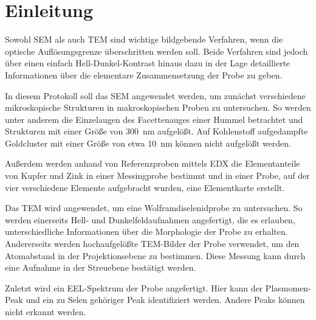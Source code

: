 \section{Einleitung}

	Sowohl SEM als auch TEM sind wichtige bildgebende Verfahren, wenn die optische Auflösungsgrenze überschritten werden soll.
	Beide Verfahren sind jedoch über einen einfach Hell-Dunkel-Kontrast hinaus dazu in der Lage detaillierte Informationen über die elementare Zusammensetzung der Probe zu geben.

	In diesem Protokoll soll das SEM angewendet werden, um zunächst verschiedene mikroskopische Strukturen in makroskopischen Proben zu untersuchen.
	So werden unter anderem die Einzelaugen des Facettenauges einer Hummel betrachtet und Strukturen mit einer Größe von \SI{300}{nm} aufgelößt.
	Auf Kohlenstoff aufgedampfte Goldcluster mit einer Größe von etwa \SI{10}{nm} können nicht aufgelößt werden.

	Außerdem werden anhand von Referenzproben mittels EDX die Elementanteile von Kupfer und Zink in einer Messingprobe bestimmt und in einer Probe, auf der vier verschiedene Elemente aufgebracht wurden, eine Elementkarte erstellt.
	\par
	Das TEM wird angewendet, um eine Wolframdiselenidprobe zu untersuchen.
	So werden einerseits Hell- und Dunkelfeldaufnahmen angefertigt, die es erlauben, unterschiedliche Informationen über die Morphologie der Probe zu erhalten.
	Andererseits werden hochaufgelößte TEM-Bilder der Probe verwendet, um den Atomabstand in der Projektionsebene zu bestimmen.
	Diese Messung kann durch eine Aufnahme in der Streuebene bestätigt werden.

	Zuletzt wird ein EEL-Spektrum der Probe angefertigt.
	Hier kann der Plasmomen-Peak und ein zu Selen gehöriger Peak identifiziert werden.
	Andere Peaks können nicht erkannt werden.

